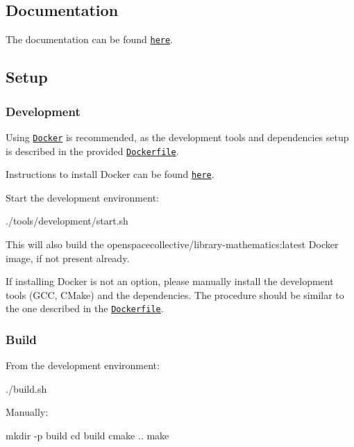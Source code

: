 \subsection*{Documentation}

The documentation can be found \href{https://open-space-collective.github.io/library-mathematics}{\tt here}.

\subsection*{Setup}

\subsubsection*{Development}

Using \href{https://www.docker.com}{\tt Docker} is recommended, as the development tools and dependencies setup is described in the provided \href{./tools/development/docker/Dockerfile}{\tt Dockerfile}.

Instructions to install Docker can be found \href{https://docs.docker.com/install/}{\tt here}.

Start the development environment\+:


\begin{DoxyCode}
./tools/development/start.sh
\end{DoxyCode}


This will also build the {\ttfamily openspacecollective/library-\/mathematics\+:latest} Docker image, if not present already.

If installing Docker is not an option, please manually install the development tools (G\+CC, C\+Make) and the dependencies. The procedure should be similar to the one described in the \href{./tools/development/docker/Dockerfile}{\tt Dockerfile}.

\subsubsection*{Build}

From the development environment\+:


\begin{DoxyCode}
./build.sh
\end{DoxyCode}


Manually\+:


\begin{DoxyCode}
mkdir -p build
cd build
cmake ..
make
\end{DoxyCode}


